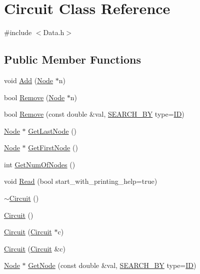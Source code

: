 \hypertarget{class_circuit}{}\section{Circuit Class Reference}
\label{class_circuit}


{\ttfamily \#include $<$Data.\+h$>$}

\subsection*{Public Member Functions}
\begin{DoxyCompactItemize}
\item 
void \hyperlink{class_circuit_ac8df627490e7b70cbdc547c2be4337d4}{Add} (\hyperlink{class_node}{Node} $\ast$n)
\item 
bool \hyperlink{class_circuit_a727524e3f110219f51bcbc4e057f12ef}{Remove} (\hyperlink{class_node}{Node} $\ast$n)
\item 
bool \hyperlink{class_circuit_abe72294beb015a2662f1ee79d2409b8b}{Remove} (const double \&val, \hyperlink{_data_8h_a6262d734859ff0be0daa3fe3b8eccbcd}{S\+E\+A\+R\+C\+H\+\_\+\+BY} type=\hyperlink{_data_8h_a6262d734859ff0be0daa3fe3b8eccbcda001479a58fb44c39a29b20d565081a68}{ID})
\item 
\hyperlink{class_node}{Node} $\ast$ \hyperlink{class_circuit_aeb86f8d79ac985158d41fbee772cc4fc}{Get\+Last\+Node} ()
\item 
\hyperlink{class_node}{Node} $\ast$ \hyperlink{class_circuit_aff4874c7202cfdba682aec96a9bb4079}{Get\+First\+Node} ()
\item 
int \hyperlink{class_circuit_aa78d50e940323ecd69d42fa2219aeff8}{Get\+Num\+Of\+Nodes} ()
\item 
void \hyperlink{class_circuit_a66f32b5192bba342006dbc8f512fda12}{Read} (bool start\+\_\+with\+\_\+printing\+\_\+help=true)
\item 
\hyperlink{class_circuit_a1134e16f26a878377f4d502bff111b9e}{$\sim$\+Circuit} ()
\item 
\hyperlink{class_circuit_a6a9c21735a28f1222797d71ece99521c}{Circuit} ()
\item 
\hyperlink{class_circuit_aaf90541f622878c55fe6377e9d656684}{Circuit} (\hyperlink{class_circuit}{Circuit} $\ast$c)
\item 
\hyperlink{class_circuit_ae98bb5b64036d61c927cfbb2a1e82ad0}{Circuit} (\hyperlink{class_circuit}{Circuit} \&c)
\item 
\hyperlink{class_node}{Node} $\ast$ \hyperlink{class_circuit_ad3a83fee410a9d1324725300564e34b3}{Get\+Node} (const double \&val, \hyperlink{_data_8h_a6262d734859ff0be0daa3fe3b8eccbcd}{S\+E\+A\+R\+C\+H\+\_\+\+BY} type=\hyperlink{_data_8h_a6262d734859ff0be0daa3fe3b8eccbcda001479a58fb44c39a29b20d565081a68}{ID})

\end{DoxyCompactItemize}
